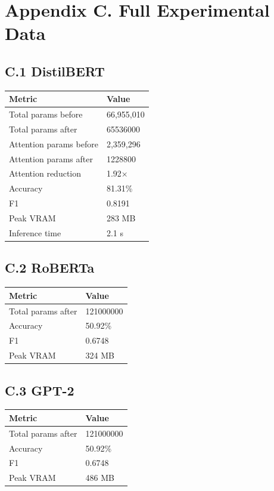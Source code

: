 \section{Appendix C. Full Experimental Data}

\subsection{C.1 DistilBERT}

\begin{table}[H]
\centering
\small
\begin{tabular}{ll}
\toprule
\textbf{Metric} & \textbf{Value} \\
\midrule
Total params before & 66,955,010 \\
Total params after & 65536000 \\
Attention params before & 2,359,296 \\
Attention params after & 1228800 \\
Attention reduction & 1.92$\times$ \\
Accuracy & 81.31\% \\
F1 & 0.8191 \\
Peak VRAM & 283 MB \\
Inference time & 2.1 s \\
\bottomrule
\end{tabular}
\end{table}

\subsection{C.2 RoBERTa}

\begin{table}[H]
\centering
\small
\begin{tabular}{ll}
\toprule
\textbf{Metric} & \textbf{Value} \\
\midrule
Total params after & 121000000 \\
Accuracy & 50.92\% \\
F1 & 0.6748 \\
Peak VRAM & 324 MB \\
\bottomrule
\end{tabular}
\end{table}

\subsection{C.3 GPT-2}

\begin{table}[H]
\centering
\small
\begin{tabular}{ll}
\toprule
\textbf{Metric} & \textbf{Value} \\
\midrule
Total params after & 121000000 \\
Accuracy & 50.92\% \\
F1 & 0.6748 \\
Peak VRAM & 486 MB \\
\bottomrule
\end{tabular}
\end{table}

